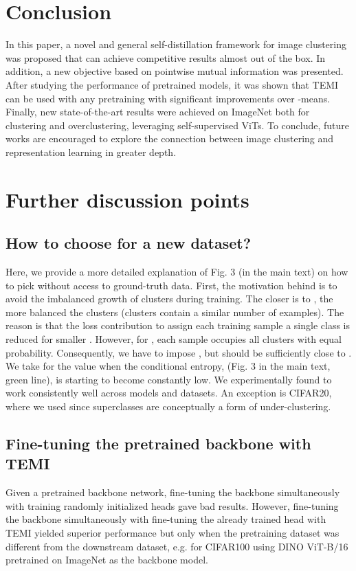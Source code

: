 \documentclass{bmvc2k}
\begin{document}
\section{Conclusion}
\label{conclusion}
In this paper, a novel and general self-distillation framework for image clustering was proposed that can achieve competitive results almost out of the box. In addition, a new objective based on pointwise mutual information was presented. After studying the performance of  pretrained models, it was shown that TEMI can be used with any pretraining with significant improvements over -means. Finally, new state-of-the-art results were achieved on ImageNet both for clustering and overclustering, leveraging self-supervised ViTs. To conclude, future works are encouraged to explore the connection between image clustering and representation learning in greater depth.


\clearpage{}\appendix



\section{Further discussion points}

\subsection{How to choose  for a new dataset?}
Here, we provide a more detailed explanation of Fig. 3 (in the main text) on how to pick  without access to ground-truth data. First, the motivation behind  is to avoid the imbalanced growth of clusters during training. The closer  is to , the more balanced the clusters (clusters contain a similar number of examples). The reason is that the loss contribution to assign each training sample a single class is reduced for smaller . However, for , each sample occupies all clusters with equal probability. Consequently, we have to impose , but  should be sufficiently close to . We take for  the value when the conditional entropy,  (Fig. 3 in the main text, green line), is starting to become constantly low. We experimentally found  to work consistently well across models and datasets. An exception is CIFAR20, where we used  since superclasses are conceptually a form of under-clustering. 


\subsection{Fine-tuning the pretrained backbone with TEMI}
Given a pretrained backbone network, fine-tuning the backbone simultaneously with training randomly initialized heads gave bad results. However, fine-tuning the backbone simultaneously with fine-tuning the already trained head with TEMI yielded superior performance but only when the pretraining dataset was different from the downstream dataset, e.g.  for CIFAR100 using DINO ViT-B/16 pretrained on ImageNet as the backbone model.
\end{document}
